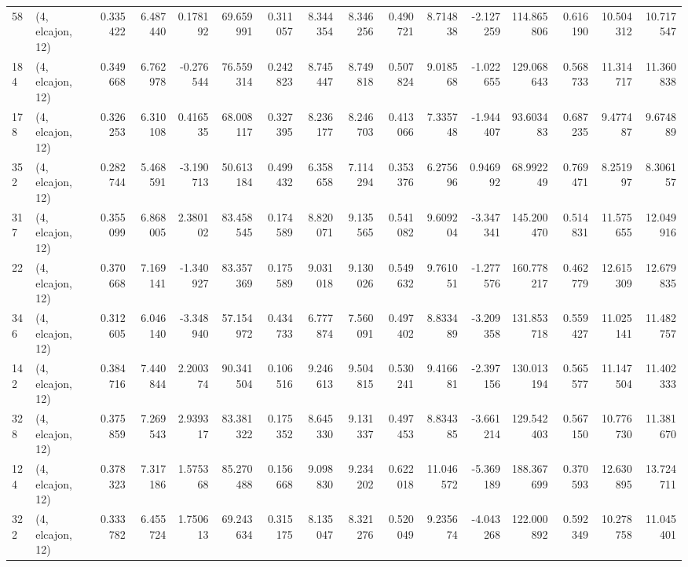 \begin{tabular}{llrrrrrrrrrrrrrr}
58  &  (4, elcajon, 12) &   0.335422 &   6.487440 &   0.178192 &    69.659991 &   0.311057 &   8.344354 &   8.346256 &  0.490721 &   8.714838 &  -2.127259 &    114.865806 &   0.616190 &   10.504312 &   10.717547 \\
184 &  (4, elcajon, 12) &   0.349668 &   6.762978 &  -0.276544 &    76.559314 &   0.242823 &   8.745447 &   8.749818 &  0.507824 &   9.018568 &  -1.022655 &    129.068643 &   0.568733 &   11.314717 &   11.360838 \\
178 &  (4, elcajon, 12) &   0.326253 &   6.310108 &   0.416535 &    68.008117 &   0.327395 &   8.236177 &   8.246703 &  0.413066 &   7.335748 &  -1.944407 &     93.603483 &   0.687235 &    9.477487 &    9.674889 \\
352 &  (4, elcajon, 12) &   0.282744 &   5.468591 &  -3.190713 &    50.613184 &   0.499432 &   6.358658 &   7.114294 &  0.353376 &   6.275696 &   0.946992 &     68.992249 &   0.769471 &    8.251997 &    8.306157 \\
317 &  (4, elcajon, 12) &   0.355099 &   6.868005 &   2.380102 &    83.458545 &   0.174589 &   8.820071 &   9.135565 &  0.541082 &   9.609204 &  -3.347341 &    145.200470 &   0.514831 &   11.575655 &   12.049916 \\
22  &  (4, elcajon, 12) &   0.370668 &   7.169141 &  -1.340927 &    83.357369 &   0.175589 &   9.031018 &   9.130026 &  0.549632 &   9.761051 &  -1.277576 &    160.778217 &   0.462779 &   12.615309 &   12.679835 \\
346 &  (4, elcajon, 12) &   0.312605 &   6.046140 &  -3.348940 &    57.154972 &   0.434733 &   6.777874 &   7.560091 &  0.497402 &   8.833489 &  -3.209358 &    131.853718 &   0.559427 &   11.025141 &   11.482757 \\
142 &  (4, elcajon, 12) &   0.384716 &   7.440844 &   2.200374 &    90.341504 &   0.106516 &   9.246613 &   9.504815 &  0.530241 &   9.416681 &  -2.397156 &    130.013194 &   0.565577 &   11.147504 &   11.402333 \\
328 &  (4, elcajon, 12) &   0.375859 &   7.269543 &   2.939317 &    83.381322 &   0.175352 &   8.645330 &   9.131337 &  0.497453 &   8.834385 &  -3.661214 &    129.542403 &   0.567150 &   10.776730 &   11.381670 \\
124 &  (4, elcajon, 12) &   0.378323 &   7.317186 &   1.575368 &    85.270488 &   0.156668 &   9.098830 &   9.234202 &  0.622018 &  11.046572 &  -5.369189 &    188.367699 &   0.370593 &   12.630895 &   13.724711 \\
322 &  (4, elcajon, 12) &   0.333782 &   6.455724 &   1.750613 &    69.243634 &   0.315175 &   8.135047 &   8.321276 &  0.520049 &   9.235674 &  -4.043268 &    122.000892 &   0.592349 &   10.278758 &   11.045401 \\

\end{tabular}
